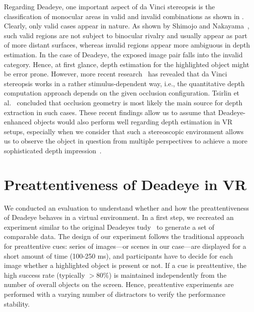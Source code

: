 \documentclass[journal]{vgtc}                %
\begin{document}
Regarding Deadeye, one important aspect of da Vinci stereopsis is the classification of monocular areas in valid and invalid combinations as shown in . Clearly, only valid cases appear in nature. As shown by Shimojo and Nakayama~\cite{shimojo1990real}, such valid regions are not subject to binocular rivalry and usually appear as part of more distant surfaces, whereas invalid regions appear more ambiguous in depth estimation. In the case of Deadeye, the exposed image pair falls into the invalid category. Hence, at first glance, depth estimation for the highlighted object might be error prone. However, more recent research~\cite{HAKKINEN19963815,ASSEE20072585,gillam2003monocular} has revealed that da Vinci stereopsis works in a rather stimulus-dependent way, i.e., the quantitative depth computation approach depends on the given occlusion configuration. Tsirlin et al.~\cite{tsirlin2012vinci} concluded that occlusion geometry is most likely the main source for depth extraction in such cases. These recent findings allow us to assume that Deadeye-enhanced objects would also perform well regarding depth estimation in VR setups, especially when we consider that such a stereoscopic environment allows us to observe the object in question from multiple perspectives to achieve a more sophisticated depth impression~\cite{shimojo1988occlusion}.



















\section{Preattentiveness of Deadeye in VR}

We conducted an evaluation to understand whether and how the preattentiveness of Deadeye behaves in a virtual environment. In a first step, we recreated an experiment similar to the original Deadeyes tudy~\cite{krekhov2019deadeye} to generate a set of comparable data. The design of our experiment follows the traditional approach for preattentive cues: series of images---or scenes in our case---are displayed for a short amount of time (100-250 ms), and participants have to decide for each image whether a highlighted object is present or not. If a cue is preattentive, the high success rate (typically $>80$\%) is maintained independently from the number of overall objects on the screen. Hence, preattentive experiments are performed with a varying number of distractors to verify the performance stability.
\end{document}
